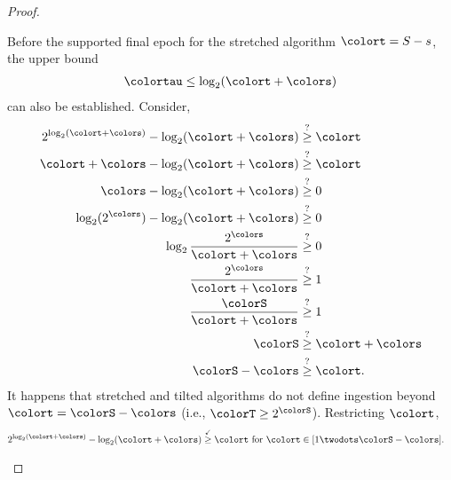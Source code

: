 \begin{proof}
\begin{proofpart}
Before the supported final epoch for the stretched algorithm $\colort = S - s$, the upper bound
\begin{align}
\colortau \leq \log_2(\colort + \colors) \label{eqn:meta-epoch-bound-large}
\end{align}
can also be established.
Consider,
\begin{align*}
2^{\log_{2}(\colort + \colors)} - \log_2(\colort + \colors)
&\stackrel{?}{\geq} \colort\\
\colort + \colors - \log_2(\colort + \colors)
&\stackrel{?}{\geq} \colort\\
\colors - \log_2(\colort + \colors)
&\stackrel{?}{\geq} 0\\
\log_2(2^{\colors}) - \log_2(\colort + \colors)
&\stackrel{?}{\geq} 0\\
\log_2\frac{2^{\colors}}{\colort + \colors}
&\stackrel{?}{\geq} 0\\
\frac{2^{\colors}}{\colort + \colors}
&\stackrel{?}{\geq} 1\\
\frac{\colorS}{\colort + \colors}
&\stackrel{?}{\geq} 1\\
\colorS
&\stackrel{?}{\geq} \colort + \colors\\
\colorS - \colors &\stackrel{?}{\geq} \colort.
\end{align*}
It happens that stretched and tilted algorithms do not define ingestion beyond $\colort = \colorS - \colors$ (i.e., $\colorT \geq 2^{\colorS}$).
Restricting $\colort$,
\begin{align*}
2^{\log_{2}(\colort + \colors)} - \log_2(\colort + \colors)
&\stackrel{\checkmark}{\geq} \colort \text{ for } \colort \in [1 \twodots \colorS - \colors].
\end{align*}
\end{proofpart}
\end{proof}
